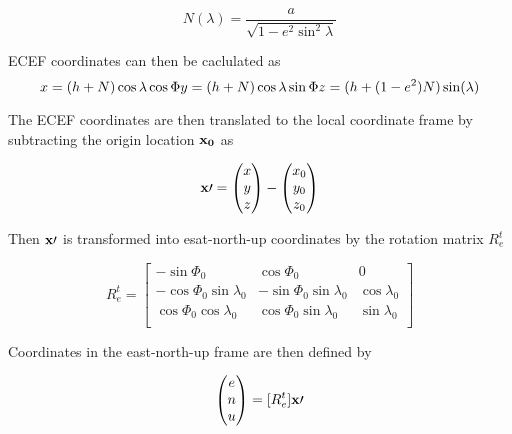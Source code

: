 \documentclass{aiaa}
\begin{document}
\begin{equation}
N(\lambda)=\frac{a}{\sqrt{1-e^2\sin^2{\lambda}}}
\end{equation}

ECEF coordinates can then be caclulated as
\begin{equation}
x=(h+N)\cos{\lambda}\cos{\Phi} \\
y=(h+N)\cos{\lambda}\sin{\Phi} \\
z=(h+(1-e^2)N)\sin(\lambda)
\end{equation}

The ECEF coordinates are then translated to the local coordinate frame by subtracting the origin location $\bold{x_0}$ as

\begin{equation}
\bold{x\prime} = 
	\begin{pmatrix}
    	x \\
        y \\ 
        z \\
    \end{pmatrix}
    -
    \begin{pmatrix}
    	x_0 \\
        y_0 \\ 
        z_0 \\
    \end{pmatrix}
\end{equation}
   
   
   Then $\bold{x\prime}$ is transformed into esat-north-up coordinates by the rotation matrix $R_e^t$
   
   \begin{equation}
   	R_e^t = 
    	\begin{bmatrix}
        -\sin{\Phi_0} & \cos{\Phi_0} & 0 \\
        -\cos{\Phi_0}\sin{\lambda_0} & -\sin{\Phi_0}\sin{\lambda_0} & \cos{\lambda_0}\\
        \cos{\Phi_0}\cos{\lambda_0} & \cos{\Phi_0}\sin{\lambda_0} & \sin{\lambda_0}\\
        \end{bmatrix}
    \end{equation}
    
    Coordinates in the east-north-up frame are then defined by
    
    \begin{equation}
    \begin{pmatrix}
    	e \\ 
        n \\
        u \\
    \end{pmatrix}
    =[R_e^t]\bold{x\prime}
    \end{equation}
    
\end{document}
